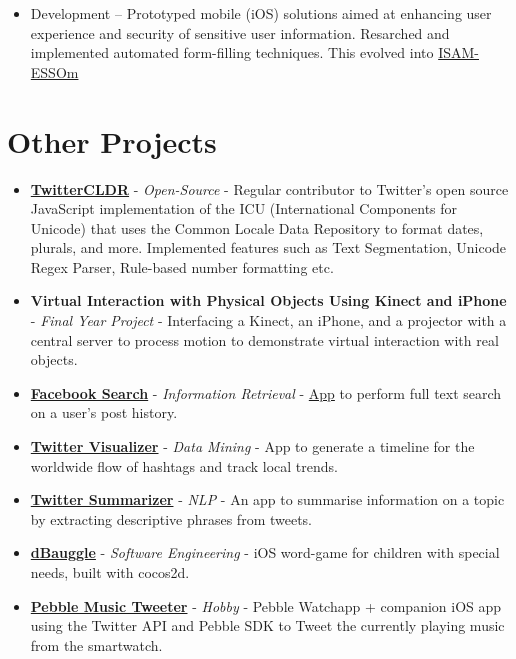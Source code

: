 \begin{itemize}
  \begin{itemize}
  \tightlist
  \item
    Development -- Prototyped mobile (iOS) solutions aimed at enhancing
    user experience and security of sensitive user information.
    Resarched and implemented automated form-filling techniques. This
    evolved into
    \href{https://itunes.apple.com/us/app/isam-essom/id741972716?mt=8}{ISAM-ESSOm}
  \end{itemize}
\end{itemize}

\section{Other Projects}\label{other-projects}

\begin{itemize}
\item
  \href{https://github.com/twitter/twitter-cldr-js}{\textbf{TwitterCLDR}}
  - \emph{Open-Source} - Regular contributor to Twitter's open source
  JavaScript implementation of the ICU (International Components for
  Unicode) that uses the Common Locale Data Repository to format dates,
  plurals, and more. Implemented features such as Text Segmentation,
  Unicode Regex Parser, Rule-based number formatting etc.
\item
  \textbf{Virtual Interaction with Physical Objects Using Kinect and
  iPhone} - \emph{Final Year Project} - Interfacing a Kinect, an iPhone,
  and a projector with a central server to process motion to demonstrate
  virtual interaction with real objects.
\item
  \href{https://github.com/arnavk/FacebookSearch}{\textbf{Facebook
  Search}} - \emph{Information Retrieval} -
  \href{http://facebook-search.herokuapp.com/}{App} to perform full text
  search on a user's post history.
\item
  \href{https://github.com/arnavk/Twitter-Visualiser}{\textbf{Twitter
  Visualizer}} - \emph{Data Mining} - App to generate a timeline for the
  worldwide flow of hashtags and track local trends.
\item
  \href{https://github.com/arnavk/NLP}{\textbf{Twitter Summarizer}} -
  \emph{NLP} - An app to summarise information on a topic by extracting
  descriptive phrases from tweets.
\item
  \href{https://itunes.apple.com/us/app/dbauggle!/id625981185?mt=8}{\textbf{dBauggle}}
  - \emph{Software Engineering} - iOS word-game for children with
  special needs, built with cocos2d.
\item
  \href{https://github.com/arnavk/Pebble-MusicTweeter}{\textbf{Pebble
  Music Tweeter}} - \emph{Hobby} - Pebble Watchapp + companion iOS app
  using the Twitter API and Pebble SDK to Tweet the currently playing
  music from the smartwatch.
\end{itemize}

